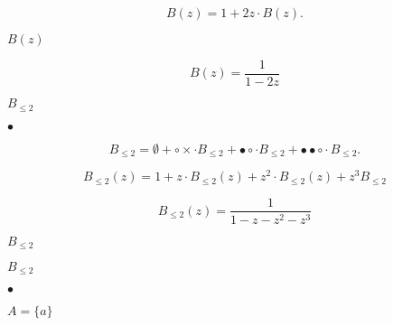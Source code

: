 \documentclass[10pt]{book}
\begin{document}
\begin{mdSnippets}
\begin{mdDisplaySnippet}[3359a0ee5a38412f5b8a9a46108a25b2]
\[%
B(z) = 1 + 2z\cdot B(z).
\]%
\end{mdDisplaySnippet}%
\begin{mdInlineSnippet}[73723f147a6eb605351fc7f278dcecef]%
$B(z)$\end{mdInlineSnippet}%
\begin{mdDisplaySnippet}[0ff8cbcdaa74bf811c9d6c11d98b136b]%
\[%
B(z) = \frac{1}{1-2z}
\]%
\end{mdDisplaySnippet}%
\begin{mdInlineSnippet}[1115e702e0237b316fbda63a111a29e5]%
$B_{\leq 2}$\end{mdInlineSnippet}%
\begin{mdInlineSnippet}[71976219fb1234a4f2ba6bef7a046183]%
$\bullet$\end{mdInlineSnippet}%
\begin{mdDisplaySnippet}[76100419ded65de5176c361a72d8235b]%
\[%
B_{\leq2} = \emptyset + \circ\times \cdot B_{\leq2} + \bullet\circ \cdot B_{\leq2} 
+\bullet\bullet\circ \cdot B_{\leq2}.
\]%
\end{mdDisplaySnippet}%
\begin{mdDisplaySnippet}[59e23d24b1c0fc680c52b781f7c52136]%
\[%
B_{\leq2}(z) = 1 + z\cdot B_{\leq 2}(z) + z^2\cdot B_{\leq 2}(z)+z^3 B_{\leq2}
\]%
\end{mdDisplaySnippet}%
\begin{mdDisplaySnippet}[03b813d449780dc7000064dd40b5bf64]%
\[%
B_{\leq2}(z)  = \frac{1}{1 - z - z^2 - z^3}
\]%
\end{mdDisplaySnippet}%
\begin{mdInlineSnippet}[79cb4a2c6de0786af0273a19f0234091]%
$B_{\leq2}$\end{mdInlineSnippet}%
\begin{mdInlineSnippet}[79cb4a2c6de0786af0273a19f0234091]%
$B_{\leq2}$\end{mdInlineSnippet}%
\begin{mdInlineSnippet}[71976219fb1234a4f2ba6bef7a046183]%
$\bullet$\end{mdInlineSnippet}%
\begin{mdInlineSnippet}[0f5695a0c392b0bcdebbee6d6e48b350]%
$A = \{a\}$\end{mdInlineSnippet}%

\end{mdSnippets}
\end{document}
